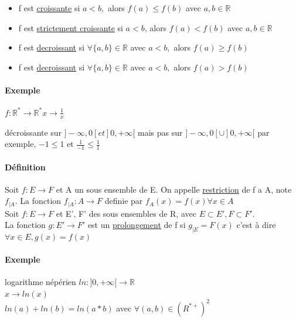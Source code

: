 \begin{itemize}
	\item f est \ul{croissante} si $a < b,$ alors $f(a) \leq f(b)$ avec $a, b \in \mathbb{R}$
	\item f est \ul{strictement croissante} si $a < b$, alors $f(a) < f(b)$ avec $a, b \in \mathbb{R}$
	\item f est \ul{decroissant} si $ \forall \{a, b\} \in \mathbb{R}$ avec $a < b,$ alors $f(a) \geq f(b)$
	\item f est \ul{decroissant} si $ \forall \{a, b\} \in \mathbb{R}$ avec $a < b,$ alors $f(a) > f(b)$
\end{itemize}

\paragraph{Exemple} $f: \mathbb{R}^* \rightarrow \mathbb{R}^*
x \rightarrow \frac{1}{x}$


décroissante sur $]-\infty, 0[ et ]0, +\infty[$ mais pas sur $]-\infty, 0[ \cup ]0, +\infty[$
par exemple, $-1 \leq 1 \text{ et } \frac{1}{-1} \leq \frac{1}{1}$

\paragraph{Définition} Soit $f:E \rightarrow F$ et A un sous ensemble de E.
On appelle \ul{restriction} de f a A, note $f_{|A}$. La fonction $f_{|A} : A \rightarrow F$ definie par $f_{A}(x) = f(x) \forall x \in A$ ~\\
Soit $f:E \rightarrow F$ et E', F' des sous ensembles de R, avec $E \subset E',F \subset F' . $ ~\\
La fonction $ g : E' \rightarrow F'$ est un \ul{prolongement} de f si $g_{|E} = F(x)$ c'est à dire $\forall x \in E, g(x) = f(x)$

\paragraph{Exemple} logarithme népérien $ln : ]0, +\infty[ \rightarrow \mathbb{R}$
	~\\
	$x \rightarrow ln(x)$
	~\\
	$ln(a) + ln(b) = ln(a*b)$ avec $\forall (a, b) \in (R^{*+})^2$


